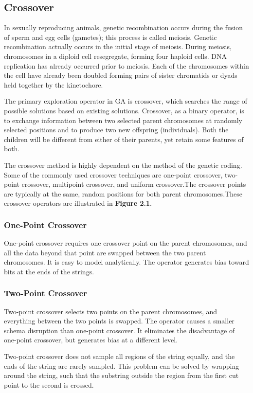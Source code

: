 \documentclass[14pt]{article}
\numberwithin{equation}{subsection}
\begin{document}
		\subsection{Crossover}In sexually reproducing animals, genetic recombination occurs during the fusion of sperm
		and egg cells (gametes); this process is called meiosis. Genetic recombination actually occurs in the initial
		stage of meiosis. During meiosis, chromosomes in a diploid cell resegregate, forming four haploid cells. DNA
		replication has already occurred prior to meiosis. Each of the chromosomes within the cell have already been
		doubled forming pairs of sister chromatids or dyads held together by the kinetochore. \par
		The primary exploration operator in GA is crossover, which searches the range of possible solutions based on
		existing solutions. Crossover, as a binary operator, is to exchange information between two selected parent
		chromosomes at randomly selected positions and to produce two new offspring (individuals). Both the children
		will be different from either of their parents, yet retain some features of both. \par
		The crossover method is highly dependent on the method of the genetic coding. Some of the commonly used
		crossover techniques are one-point crossover, two-point crossover, multipoint crossover, and uniform
		crossover.The crossover points are typically at the same, random positions for both parent chromosomes.These
		crossover operators are illustrated in \textbf{Figure 2.1}.
		
			\subsubsection{One-Point Crossover}One-point crossover requires one crossover point on the parent
			chromosomes, and all the data beyond that point are swapped between the two parent chromosomes. It
			is easy to model analytically. The operator generates bias toward bits at the ends of	the strings.
			
			\subsubsection{Two-Point Crossover}Two-point crossover selects two points on the parent chromosomes, and
			everything between the two points is swapped. The operator causes a smaller schema disruption than one-point
			crossover. It eliminates the disadvantage of one-point crossover, but generates bias at a different level. \par
			Two-point crossover does not sample all regions of the string equally, and the ends of the string are rarely
			sampled. This problem can be solved by wrapping around the string, such that the substring outside the region
			from the first cut point to the second is crossed.
		
\end{document}
